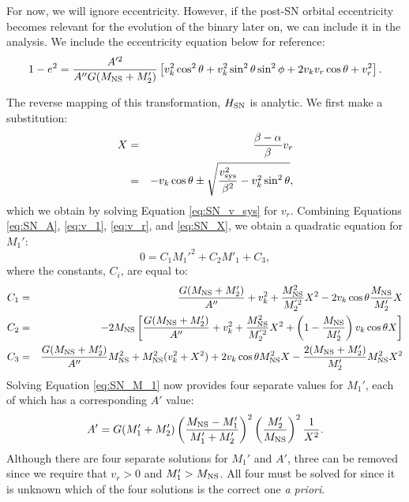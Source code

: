 \documentclass[12pt, preprint]{aastex}
\begin{document}
For now, we will ignore eccentricity. However, if the post-SN orbital eccentricity becomes relevant for the evolution of the binary later on, we can include it in the analysis. We include the eccentricity equation below for reference:
\begin{equation}
1-e^2 = \frac{A'^2}{A'' G (M_{\rm NS} + M_2')} \left[ v_k^2 \cos^2\theta + v_k^2 \sin^2 \theta \sin^2 \phi + 2 v_k v_r \cos \theta + v_r^2  \right]. \label{eq:SN_e}
\end{equation}

The reverse mapping of this transformation, $H_{\rm SN}$ is analytic. We first make a substitution:
\begin{eqnarray}
X &=& \frac{\beta - \alpha}{\beta} v_r \nonumber \\
&=& -v_k \cos\theta \pm \sqrt{\frac{v_{\rm sys}^2}{\beta^2} - v_k^2 \sin^2\theta}, \label{eq:SN_X}
\end{eqnarray}
which we obtain by solving Equation \ref{eq:SN_v_sys} for $v_r$. Combining Equations \ref{eq:SN_A}, \ref{eq:v_1}, \ref{eq:v_r}, and \ref{eq:SN_X}, we obtain a quadratic equation for $M_1'$:
\begin{equation}
0 = C_1 M_1'^{2} + C_2 M'_1 + C_3, \label{eq:SN_M_1}
\end{equation}
where the constants, $C_i$, are equal to:
\begin{eqnarray}
C_1 &=& \frac{G(M_{\rm NS} + M'_2)}{A''} + v_k^2 + \frac{M_{\rm NS}^2}{M_2^{'2}}X^2 - 2 v_k \cos \theta \frac{M_{\rm NS}}{M'_2}X \\
C_2 &=& -2M_{\rm NS} \left[ \frac{G(M_{\rm NS} + M'_2)}{A''} + v_k^2 + \frac{M_{\rm NS}^2}{M_2^{'2}}X^2 + \left( 1 - \frac{M_{\rm NS}}{M'_2} \right) v_k \cos \theta X \right] \\
C_3 &=& \frac{G(M_{\rm NS} + M'_2)}{A''} M_{\rm NS}^2 + M_{\rm NS}^2 (v_k^2 + X^2) + 2v_k \cos \theta M_{\rm NS}^2 X - \frac{2(M_{\rm NS} + M'_2)}{M'_2} M_{\rm NS}^2X^2
\end{eqnarray}
Solving Equation \ref{eq:SN_M_1} now provides four separate values for $M_1'$, each of which has a corresponding $A'$ value:
\begin{equation}
A' = G (M_1' + M_2') \left(\frac{M_{\rm NS} - M_1'}{M_1' + M_2'} \right)^2 \left( \frac{M_2'}{M_{\rm NS}} \right)^2 \frac{1}{X^2}. \label{eq:SN_A1}
\end{equation}
Although there are four separate solutions for $M_1'$ and $A'$, three can be removed since we require that $v_r > 0$ and $M'_1 > M_{\rm NS}$. All four must be solved for since it is unknown which of the four solutions is the correct one {\it a priori}.
\end{document}
